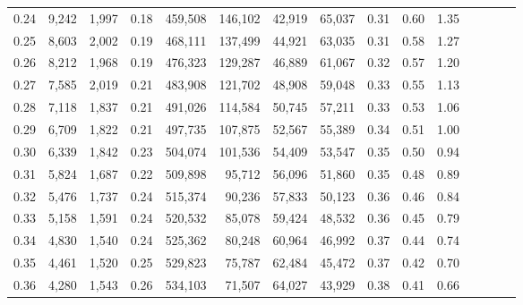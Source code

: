 \begin{tabular}{rrrcrrrrrrrrrrr}
0.24 &   9,242 &  1,997 &                                       0.18 &  459,508 &  146,102 &   42,919 &   65,037 &  0.31 &  0.60 &                         1.35 \\
0.25 &   8,603 &  2,002 &                                       0.19 &  468,111 &  137,499 &   44,921 &   63,035 &  0.31 &  0.58 &                         1.27 \\
0.26 &   8,212 &  1,968 &                                       0.19 &  476,323 &  129,287 &   46,889 &   61,067 &  0.32 &  0.57 &                         1.20 \\
0.27 &   7,585 &  2,019 &                                       0.21 &  483,908 &  121,702 &   48,908 &   59,048 &  0.33 &  0.55 &                         1.13 \\
0.28 &   7,118 &  1,837 &                                       0.21 &  491,026 &  114,584 &   50,745 &   57,211 &  0.33 &  0.53 &                         1.06 \\
0.29 &   6,709 &  1,822 &                                       0.21 &  497,735 &  107,875 &   52,567 &   55,389 &  0.34 &  0.51 &                         1.00 \\
0.30 &   6,339 &  1,842 &                                       0.23 &  504,074 &  101,536 &   54,409 &   53,547 &  0.35 &  0.50 &                         0.94 \\
0.31 &   5,824 &  1,687 &                                       0.22 &  509,898 &   95,712 &   56,096 &   51,860 &  0.35 &  0.48 &                         0.89 \\
0.32 &   5,476 &  1,737 &                                       0.24 &  515,374 &   90,236 &   57,833 &   50,123 &  0.36 &  0.46 &                         0.84 \\
0.33 &   5,158 &  1,591 &                                       0.24 &  520,532 &   85,078 &   59,424 &   48,532 &  0.36 &  0.45 &                         0.79 \\
0.34 &   4,830 &  1,540 &                                       0.24 &  525,362 &   80,248 &   60,964 &   46,992 &  0.37 &  0.44 &                         0.74 \\
0.35 &   4,461 &  1,520 &                                       0.25 &  529,823 &   75,787 &   62,484 &   45,472 &  0.37 &  0.42 &                         0.70 \\
0.36 &   4,280 &  1,543 &                                       0.26 &  534,103 &   71,507 &   64,027 &   43,929 &  0.38 &  0.41 &                         0.66 \\

\end{tabular}

